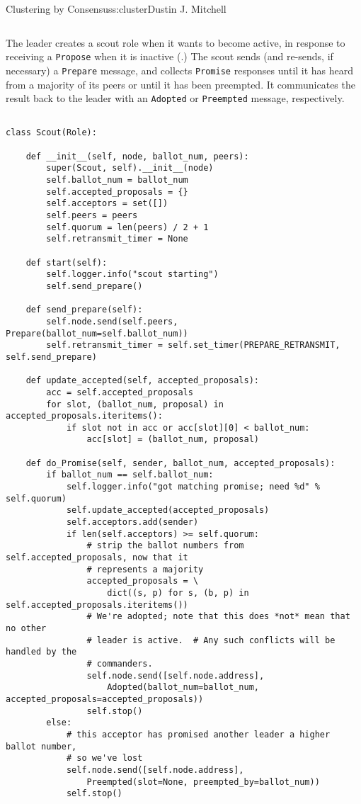 \begin{aosachapter}{Clustering by Consensus}{s:cluster}{Dustin J. Mitchell}
\begin{verbatim}
\end{verbatim}

The leader creates a scout role when it wants to become active, in
response to receiving a \texttt{Propose} when it is inactive
(.) The scout sends (and re-sends,
if necessary) a \texttt{Prepare} message, and collects \texttt{Promise}
responses until it has heard from a majority of its peers or until it
has been preempted. It communicates the result back to the leader with
an \texttt{Adopted} or \texttt{Preempted} message, respectively.


\begin{verbatim}

class Scout(Role):

    def __init__(self, node, ballot_num, peers):
        super(Scout, self).__init__(node)
        self.ballot_num = ballot_num
        self.accepted_proposals = {}
        self.acceptors = set([])
        self.peers = peers
        self.quorum = len(peers) / 2 + 1
        self.retransmit_timer = None

    def start(self):
        self.logger.info("scout starting")
        self.send_prepare()

    def send_prepare(self):
        self.node.send(self.peers, Prepare(ballot_num=self.ballot_num))
        self.retransmit_timer = self.set_timer(PREPARE_RETRANSMIT, self.send_prepare)

    def update_accepted(self, accepted_proposals):
        acc = self.accepted_proposals
        for slot, (ballot_num, proposal) in accepted_proposals.iteritems():
            if slot not in acc or acc[slot][0] < ballot_num:
                acc[slot] = (ballot_num, proposal)

    def do_Promise(self, sender, ballot_num, accepted_proposals):
        if ballot_num == self.ballot_num:
            self.logger.info("got matching promise; need %d" % self.quorum)
            self.update_accepted(accepted_proposals)
            self.acceptors.add(sender)
            if len(self.acceptors) >= self.quorum:
                # strip the ballot numbers from self.accepted_proposals, now that it
                # represents a majority
                accepted_proposals = \ 
                    dict((s, p) for s, (b, p) in self.accepted_proposals.iteritems())
                # We're adopted; note that this does *not* mean that no other
                # leader is active.  # Any such conflicts will be handled by the
                # commanders.
                self.node.send([self.node.address],
                    Adopted(ballot_num=ballot_num, accepted_proposals=accepted_proposals))
                self.stop()
        else:
            # this acceptor has promised another leader a higher ballot number,
            # so we've lost
            self.node.send([self.node.address], 
                Preempted(slot=None, preempted_by=ballot_num))
            self.stop()
    

\end{verbatim}
\end{aosachapter}
